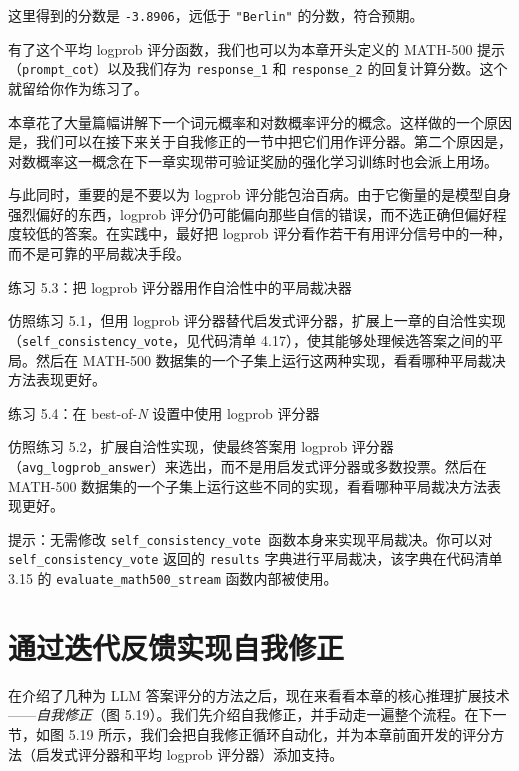 这里得到的分数是 \texttt{-3.8906}，远低于 \texttt{"}\texttt{Berlin}\texttt{"} 的分数，符合预期。

有了这个平均 logprob 评分函数，我们也可以为本章开头定义的 MATH-500 提示（\texttt{prompt\_cot}）以及我们存为 \texttt{response\_1} 和 \texttt{response\_2} 的回复计算分数。这个就留给你作为练习了。

本章花了大量篇幅讲解下一个词元概率和对数概率评分的概念。这样做的一个原因是，我们可以在接下来关于自我修正的一节中把它们用作评分器。第二个原因是，对数概率这一概念在下一章实现带可验证奖励的强化学习训练时也会派上用场。

与此同时，重要的是不要以为 logprob 评分能包治百病。由于它衡量的是模型自身强烈偏好的东西，logprob 评分仍可能偏向那些自信的错误，而不选正确但偏好程度较低的答案。在实践中，最好把 logprob 评分看作若干有用评分信号中的一种，而不是可靠的平局裁决手段。

\begin{mySidebar}{练习 5.3：把 logprob 评分器用作自洽性中的平局裁决器}

仿照练习 5.1，但用 logprob 评分器替代启发式评分器，扩展上一章的自洽性实现（\texttt{self\_consistency\_vote}，见代码清单 4.17），使其能够处理候选答案之间的平局。然后在 MATH-500 数据集的一个子集上运行这两种实现，看看哪种平局裁决方法表现更好。

\end{mySidebar}

\begin{mySidebar}{练习 5.4：在 best-of-\emph{N} 设置中使用 logprob 评分器}

仿照练习 5.2，扩展自洽性实现，使最终答案用 logprob 评分器（\texttt{avg\_logprob\_answer}）来选出，而不是用启发式评分器或多数投票。然后在 MATH-500 数据集的一个子集上运行这些不同的实现，看看哪种平局裁决方法表现更好。

提示：无需修改 \texttt{self\_consistency\_vote }函数本身来实现平局裁决。你可以对 \texttt{self\_consistency\_vote} 返回的 \texttt{results} 字典进行平局裁决，该字典在代码清单 3.15 的 \texttt{evaluate\_math500\_stream} 函数内部被使用。

\end{mySidebar}

\section{通过迭代反馈实现自我修正}

在介绍了几种为 LLM 答案评分的方法之后，现在来看看本章的核心推理扩展技术——\emph{自我修正}（图 5.19）。我们先介绍自我修正，并手动走一遍整个流程。在下一节，如图 5.19 所示，我们会把自我修正循环自动化，并为本章前面开发的评分方法（启发式评分器和平均 logprob 评分器）添加支持。

